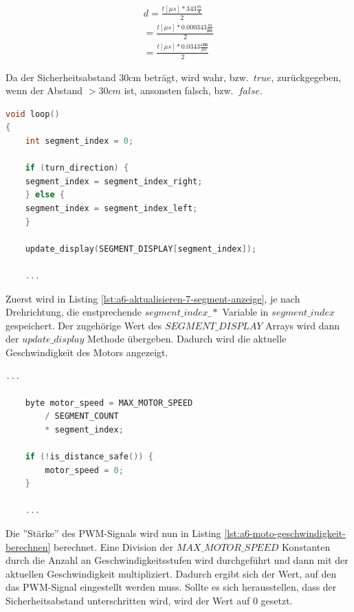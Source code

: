\begin{align}
    d = \frac{t[\mu s] * 343 \frac{m}{\mathbf{s}}}{2} \\
    = \frac{t[\mu s] * 0.000343 \frac{m}{\mathbf{\mu s}}}{2} \\
    = \frac{t[\mu s] * 0.0343 \frac{\mathbf{cm}}{\mu s}}{2}
\end{align}

Da der Sicherheitsabstand 30cm beträgt, wird wahr, bzw.\ $true$, zurückgegeben, wenn der Abstand $> 30cm$ ist, ansonsten falsch, bzw.\ $false$.

\begin{lstlisting}[language=C,label={lst:a6-aktualisieren-7-segment-anzeige}, caption={Einstellen der 7-Segment Anzeige}]
void loop()
{
    int segment_index = 0;

    if (turn_direction) {
    segment_index = segment_index_right;
    } else {
    segment_index = segment_index_left;
    }

    update_display(SEGMENT_DISPLAY[segment_index]);

    ...
\end{lstlisting}

Zuerst wird in Listing \ref{lst:a6-aktualisieren-7-segment-anzeige}, je nach Drehrichtung, die enstprechende $segment\_index\_*$ Variable in $segment\_index$ gespeichert.
Der zugehörige Wert des $SEGMENT\_DISPLAY$ Arrays wird dann der $update\_display$ Methode übergeben.
Dadurch wird die aktuelle Geschwindigkeit des Motors angezeigt.

\begin{lstlisting}[language=C,label={lst:a6-moto-geschwindigkeit-berechnen}, caption={Berechnung des PWM-Signals}]
    ...

    byte motor_speed = MAX_MOTOR_SPEED
        / SEGMENT_COUNT
        * segment_index;

    if (!is_distance_safe()) {
        motor_speed = 0;
    }

    ...
\end{lstlisting}

Die ''Stärke'' des PWM-Signals wird nun in Listing \ref{lst:a6-moto-geschwindigkeit-berechnen} berechnet.
Eine Division der $MAX\_MOTOR\_SPEED$ Konstanten durch die Anzahl an Geschwindigkeitsstufen wird durchgeführt und dann mit der aktuellen Geschwindigkeit multipliziert.
Dadurch ergibt sich der Wert, auf den das PWM-Signal eingestellt werden muss.
Sollte es sich herausstellen, dass der Sicherheitsabstand unterschritten wird, wird der Wert auf 0 gesetzt.

